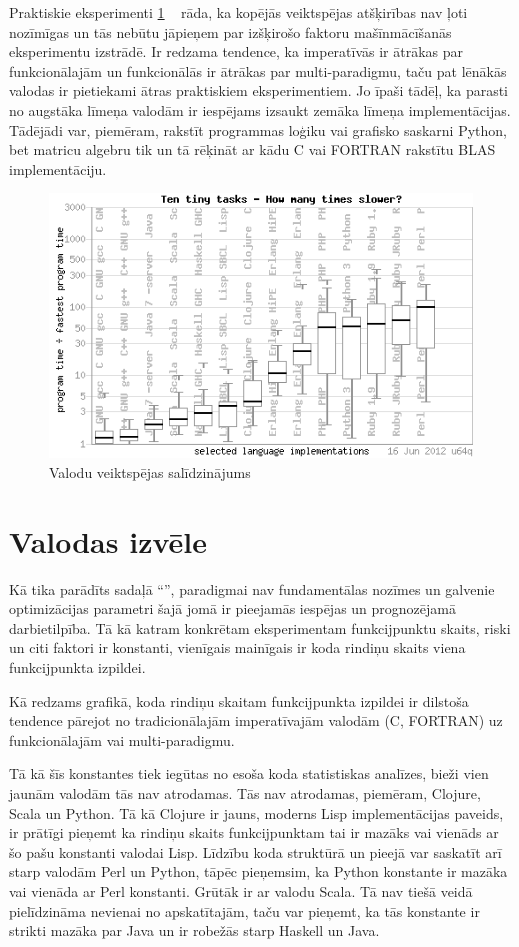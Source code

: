 \documentclass{ludis}
\begin{document}
Praktiskie eksperimenti \ref{fig:bench_game} ~\cite{bench_game} rāda, ka kopējās veiktspējas atšķirības nav ļoti nozīmīgas un tās nebūtu jāpieņem par izšķirošo faktoru mašīnmācīšanās eksperimentu izstrādē. Ir redzama tendence, ka imperatīvās ir ātrākas par funkcionālajām un funkcionālās ir ātrākas par multi-paradigmu, taču pat lēnākās valodas ir pietiekami ātras praktiskiem eksperimentiem. Jo īpaši tādēļ, ka parasti no augstāka līmeņa valodām ir iespējams izsaukt zemāka līmeņa implementācijas. Tādējādi var, piemēram, rakstīt programmas loģiku vai grafisko saskarni Python, bet matricu algebru tik un tā rēķināt ar kādu C vai FORTRAN rakstītu BLAS implementāciju.
\begin{figure}
  \centering
  \includegraphics{img/bench_game}
  \caption{Valodu veiktspējas salīdzinājums}
  \label{fig:bench_game}
\end{figure}

\section{Valodas izvēle}
Kā tika parādīts sadaļā ``'', paradigmai nav fundamentālas nozīmes un galvenie optimizācijas parametri šajā jomā ir pieejamās iespējas un prognozējamā darbietilpība. Tā kā katram konkrētam eksperimentam funkcijpunktu skaits, riski un citi faktori ir konstanti, vienīgais mainīgais ir koda rindiņu skaits viena funkcijpunkta izpildei.

Kā redzams grafikā, koda rindiņu skaitam funkcijpunkta izpildei ir dilstoša tendence pārejot no tradicionālajām imperatīvajām valodām (C, FORTRAN) uz funkcionālajām vai multi-paradigmu. 

Tā kā šīs konstantes tiek iegūtas no esoša koda statistiskas analīzes, bieži vien jaunām valodām tās nav atrodamas. Tās nav atrodamas, piemēram, Clojure, Scala un Python. Tā kā Clojure ir jauns, moderns Lisp implementācijas paveids, ir prātīgi pieņemt ka rindiņu skaits funkcijpunktam tai ir mazāks vai vienāds ar šo pašu konstanti valodai Lisp. Līdzību koda struktūrā un pieejā var saskatīt arī starp valodām Perl un Python, tāpēc pieņemsim, ka Python konstante ir mazāka vai vienāda ar Perl konstanti. Grūtāk ir ar valodu Scala. Tā nav tiešā veidā pielīdzināma nevienai no apskatītajām, taču var pieņemt, ka tās konstante ir strikti mazāka par Java un ir robežās starp Haskell un Java.
\end{document}
